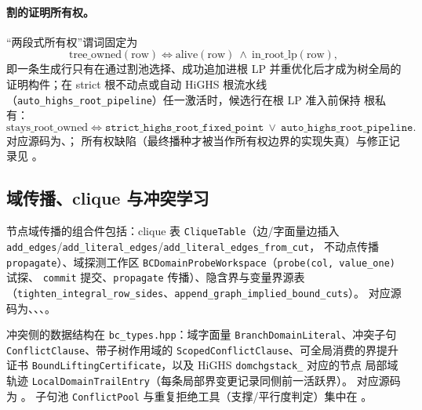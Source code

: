 \paragraph{割的证明所有权。}
``两段式所有权''谓词固定为
\begin{equation}
  \mathrm{tree\_owned}(\mathrm{row})\iff
  \mathrm{alive}(\mathrm{row})\ \land\ \mathrm{in\_root\_lp}(\mathrm{row}),
\end{equation}
即一条生成行只有在通过割池选择、成功追加进根 LP 并重优化后才成为树全局的
证明构件；在 strict 根不动点或自动 HiGHS 根流水线
（\texttt{auto\_highs\_root\_pipeline}）任一激活时，候选行在根 LP 准入前保持
根私有：
\begin{equation}
  \mathrm{stays\_root\_owned}\iff
  \texttt{strict\_highs\_root\_fixed\_point}\ \lor\
  \texttt{auto\_highs\_root\_pipeline}.
\end{equation}
对应源码为、；
所有权缺陷（最终播种才被当作所有权边界的实现失真）与修正记录见
。

\subsection{域传播、clique 与冲突学习}\label{subsec:milpbc-domain}

节点域传播的组合件包括：clique 表 \texttt{CliqueTable}（边/字面量边插入
\texttt{add\_edges}/\texttt{add\_literal\_edges}/\texttt{add\_literal\_edges\_from\_cut}，
不动点传播 \texttt{propagate}）、域探测工作区
\texttt{BCDomainProbeWorkspace}（\texttt{probe(col, value\_one)} 试探、
\texttt{commit} 提交、\texttt{propagate} 传播）、隐含界与变量界源表
（\texttt{tighten\_integral\_row\_sides}、\texttt{append\_graph\_implied\_bound\_cuts}）。
对应源码为、、、。

冲突侧的数据结构在 \texttt{bc\_types.hpp}：域字面量
\texttt{BranchDomainLiteral}、冲突子句 \texttt{ConflictClause}、带子树作用域的
\texttt{ScopedConflictClause}、可全局消费的界提升证书
\texttt{BoundLiftingCertificate}，以及 HiGHS \texttt{domchgstack\_} 对应的节点
局部域轨迹 \texttt{LocalDomainTrailEntry}（每条局部界变更记录同侧前一活跃界）。
对应源码为 。
子句池 \texttt{ConflictPool} 与重复拒绝工具（支撑/平行度判定）集中在
。

